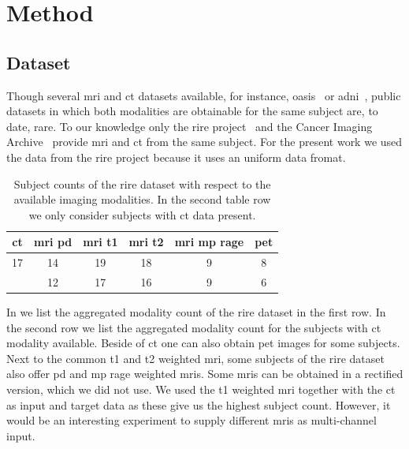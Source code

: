\section{Method}

\subsection{Dataset}

Though several \gls{mri} and \gls{ct} datasets available, for instance,
\gls{oasis}~\cite{OASIS} or \gls{adni}~\cite{ADNI}, public datasets in which
both modalities are obtainable for the same subject are, to date, rare. To our
knowledge only the \gls{rire} project~\cite{RIRE} and the Cancer Imaging
Archive~\cite{CIA} provide \gls{mri} and \gls{ct} from the same subject. For
the present work we used the data from the \gls{rire} project because it uses
an uniform data fromat.
\begin{table}[h]
  \centering
  \begin{tabular}{*{6}{c}}
    \toprule
    \acrshort{ct} &
		\acrshort{mri} \acrshort{pd} &
		\acrshort{mri} \acrshort{t1} &
		\acrshort{mri} \acrshort{t2} &
		\acrshort{mri} \acrshort{mp} \acrshort{rage} &
		\acrshort{pet} \\
    \midrule
    \num{17} & \num{14} & \num{19} & \num{18} & \num{9} & \num{8} \\
             & \num{12} & \num{17} & \num{16} & \num{9} & \num{6} \\
    \bottomrule
  \end{tabular}
  \caption{Subject counts of the \gls{rire} dataset with respect to the
    available imaging modalities. In the second table row we only consider
    subjects with \gls{ct} data present.
  }\label{tab:rire}
\end{table}
In  we list the aggregated modality count of the \gls{rire}
dataset in the first row. In the second row we list the aggregated modality
count for the subjects with \gls{ct} modality available. Beside of \gls{ct}
one can also obtain \gls{pet} images for some subjects. Next to the common
\gls{t1} and \gls{t2} weighted \gls{mri}, some subjects of the \gls{rire}
dataset also offer \gls{pd} and \gls{mp} \gls{rage} weighted \gls{mri}s. Some
\gls{mri}s can be obtained in a rectified version, which we did not use. We
used the \gls{t1} weighted \gls{mri} together with the \gls{ct} as input and
target data as these give us the highest subject count. However, it would be
an interesting experiment to supply different \gls{mri}s as multi-channel
input.

